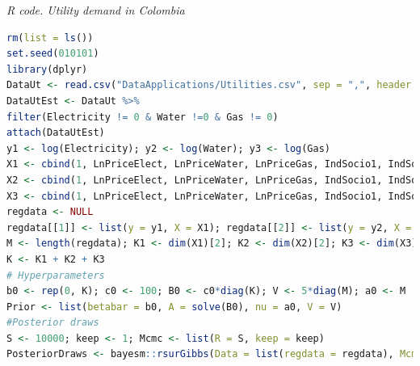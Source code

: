 \begin{tcolorbox}[enhanced,width=4.67in,center upper,
	fontupper=\large\bfseries,drop shadow southwest,sharp corners]
	\textit{R code. Utility demand in Colombia}
	\begin{VF}
		\begin{lstlisting}[language=R]
rm(list = ls())
set.seed(010101)
library(dplyr)
DataUt <- read.csv("DataApplications/Utilities.csv", sep = ",", header = TRUE, fileEncoding = "latin1")
DataUtEst <- DataUt %>%  
filter(Electricity != 0 & Water !=0 & Gas != 0)
attach(DataUtEst)
y1 <- log(Electricity); y2 <- log(Water); y3 <- log(Gas)
X1 <- cbind(1, LnPriceElect, LnPriceWater, LnPriceGas, IndSocio1, IndSocio2, Altitude, Nrooms, HouseholdMem, Lnincome)
X2 <- cbind(1, LnPriceElect, LnPriceWater, LnPriceGas, IndSocio1, IndSocio2, Nrooms, HouseholdMem)
X3 <- cbind(1, LnPriceElect, LnPriceWater, LnPriceGas, IndSocio1, IndSocio2, Altitude, Nrooms, HouseholdMem)
regdata <- NULL
regdata[[1]] <- list(y = y1, X = X1); regdata[[2]] <- list(y = y2, X = X2); regdata[[3]] <- list(y = y3, X = X3)
M <- length(regdata); K1 <- dim(X1)[2]; K2 <- dim(X2)[2]; K3 <- dim(X3)[2] 
K <- K1 + K2 + K3
# Hyperparameters
b0 <- rep(0, K); c0 <- 100; B0 <- c0*diag(K); V <- 5*diag(M); a0 <- M
Prior <- list(betabar = b0, A = solve(B0), nu = a0, V = V)
#Posterior draws
S <- 10000; keep <- 1; Mcmc <- list(R = S, keep = keep)
PosteriorDraws <- bayesm::rsurGibbs(Data = list(regdata = regdata), Mcmc = Mcmc, Prior = Prior)
\end{lstlisting}
	\end{VF}
\end{tcolorbox}

